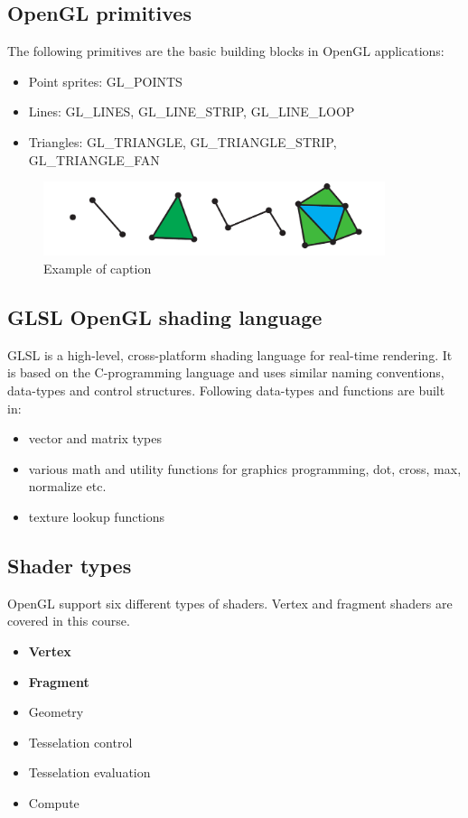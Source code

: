 \subsection*{OpenGL primitives}
The following primitives are the basic building blocks in OpenGL applications: 
\begin{itemize}
	\item Point sprites: GL\_POINTS
	\item Lines: GL\_LINES, GL\_LINE\_STRIP, GL\_LINE\_LOOP
	\item Triangles: GL\_TRIANGLE, GL\_TRIANGLE\_STRIP, GL\_TRIANGLE\_FAN
\end{itemize}

\begin{figure}[ht!]
\centering
\includegraphics[width=100mm]{figures/primitives.pdf}
\caption{Example of caption}
\label{fig:example}
\end{figure}

\subsection*{GLSL OpenGL shading language}
GLSL is a high-level, cross-platform shading language for real-time rendering. It is based on the C-programming language and uses similar naming conventions, data-types and control structures. Following data-types and functions are built in:
\begin{itemize}
	\item vector and matrix types
	\item various math and utility functions for graphics programming, dot, cross, max, normalize etc.
	\item texture lookup functions
\end{itemize}

\subsection*{Shader types}
OpenGL support six different types of shaders. Vertex and fragment shaders are covered in this course.
\begin{itemize}
	\item \textbf{Vertex}
	\item \textbf{Fragment}
	\item Geometry
	\item Tesselation control
	\item Tesselation evaluation
	\item Compute
\end{itemize}

